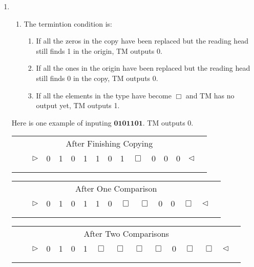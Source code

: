 \documentclass[12pt,a4paper]{article}
\makeatletter
\newtheorem*{solution}{Solution}
\theoremstyle{definition}
\renewenvironment{solution}[1][Solution] {\par\pushQED{\qed}\normalfont\topsep6\p@\@plus6\p@\relax\trivlist\item[\hskip\labelsep\bfseries#1\@addpunct{.}]\ignorespaces}{\popQED\endtrivlist\@endpefalse} \makeatother
\makeatother
\begin{document}
\begin{enumerate}
\begin{enumerate}
\begin{solution}
\begin{enumerate}
\begin{enumerate}
	        \end{enumerate}
	        \item The termintion condition is:
	        \begin{enumerate}
	             \item If all the zeros in the copy have been replaced  but the reading head still finds 1 in the origin, TM outputs 0.
                \item If all the ones in the origin have been replaced but the reading head still finds 0 in the copy, TM outputs 0.
                \item If all the elements in the type have become $\Box$ and TM has no output yet, TM outputs 1.
	        \end{enumerate}
	        \end{enumerate}
	   Here is one example of inputing $\mathbf{0101101}$. TM outputs 0.
	
	        	\begin{center}
		\begin{tabular}{ll|c|c|c|c|c|c|c|c|c|c|c|c|c|c}
			& \multicolumn{14}{c}{After Finishing Copying}\\[5pt]
			\cline{2-16}
			& & $\triangleright$ &  0  & 1 & 0 & 1 & 1 & 0 & 1 & $\Box$ & 0 & 0 & 0 & $ \triangleleft$ & \\
			\cline{2-16}
			\multicolumn{2}{c}{} & \multicolumn{1}{c}{} & \multicolumn{11}{c}{}\\[-4pt]
			\multicolumn{2}{c}{} & \multicolumn{1}{c}{} & \multicolumn{11}{c}{}	
		\end{tabular}
	\end{center}
	        \begin{center}
		\begin{tabular}{ll|c|c|c|c|c|c|c|c|c|c|c|c|c|c}
			& \multicolumn{14}{c}{After One Comparison}\\[5pt]
			\cline{2-16}
			& & $\triangleright$ &  0  & 1 & 0 & 1 & 1 & 0 & $\Box$ & $\Box$ & 0 & 0 & $\Box$ & $ \triangleleft$ & \\
			\cline{2-16}
			\multicolumn{2}{c}{} & \multicolumn{1}{c}{} & \multicolumn{11}{c}{}\\[-4pt]
			\multicolumn{2}{c}{} & \multicolumn{1}{c}{} & \multicolumn{11}{c}{}	
		\end{tabular}
	\end{center}
	\begin{center}
		\begin{tabular}{ll|c|c|c|c|c|c|c|c|c|c|c|c|c|c}
			& \multicolumn{14}{c}{After Two Comparisons}\\[5pt]
			\cline{2-16}
			& & $\triangleright$ &  0  & 1 & 0 & 1 & $\Box$ & $\Box$ & $\Box$ & $\Box$ & 0 & $\Box$ & $\Box$ & $ \triangleleft$ & \\
			\cline{2-16}
			\multicolumn{2}{c}{} & \multicolumn{1}{c}{} & \multicolumn{11}{c}{}\\[-4pt]
			\multicolumn{2}{c}{} & \multicolumn{1}{c}{} & \multicolumn{11}{c}{}	
		\end{tabular}
	\end{center}
	

\end{solution}
\end{enumerate}
\end{enumerate}
\end{document}
